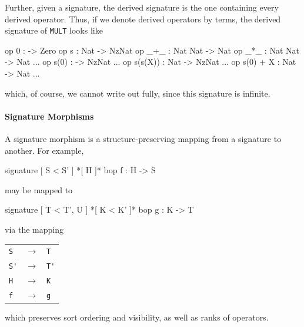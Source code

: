 \documentclass[a4paper]{memoir}
\begin{document}
Further, given a signature, the derived signature
is the one containing every derived operator.
Thus, if we denote derived operators by terms,
the derived signature of \verb|MULT| looks like
\begin{vvtm}
\begin{ccode}
  op 0 : -> Zero
  op s : Nat -> NzNat
  op _+_ : Nat Nat -> Nat
  op _*_ : Nat Nat -> Nat
  ...
  op s(0) : -> NzNat
  ...
  op s(s(X)) : Nat -> NzNat
  ...
  op s(0) + X : Nat -> Nat
  ...
\end{ccode}
\end{vvtm}
which, of course, we cannot write out fully, since this signature is
infinite.

\paragraph{Signature Morphisms}

A signature morphism is a structure-preserving
mapping from a signature to another. For example,
\begin{vvtm}
\begin{ccode}
  signature {
    [ S < S' ]
    *[ H ]*
    bop f : H -> S 
  }
\end{ccode}
\end{vvtm}
may be mapped to
\begin{vvtm}
\begin{ccode}
  signature {
    [ T < T', U ]
    *[ K < K' ]*
    bop g : K -> T
  }
\end{ccode}
\end{vvtm}
via the mapping

\begin{tabular}{lll}
\verb|S| & $\to$ & \verb|T| \\
\verb|S'| & $\to$ & \verb|T'| \\
\verb|H| & $\to$ & \verb|K| \\
\verb|f| & $\to$ & \verb|g| \\
\end{tabular}

which preserves sort ordering and visibility, as well as ranks of
operators.
\end{document}
